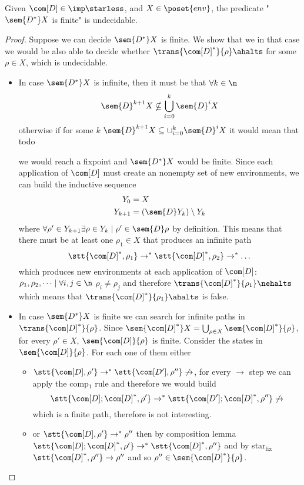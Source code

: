 \begin{lemma}\label{le:infiniteness}
  Given \(\com[D]\in\imp\starless\), and \(X \in \poset{env}\), the
  predicate "\(\sem{D^*}X\) is finite" is undecidable.
\end{lemma}

\begin{proof}
  Suppose we can decide \(\sem{D^*}X\) is finite. We show that we in
  that case we would be also able to decide whether
  \(\trans{\com[D]^*}{\rho}\ahalts\) for some \(\rho \in X\), which is
  undecidable.%
  \begin{itemize}
  \item In case \(\sem{D^*}X\) is infinite, then it must be that
    \(\forall k \in \n\)
    \[\sem{D}^{k+1}X \nsubseteq \bigcup_{i=0}^k\sem{D}^iX\] otherwise if
    for some \(k\) \(\sem{D}^{k+1}X \subseteq \cup_{i=0}^k\sem{D}^iX\)
    it would mean that  todo
    
    we would reach a fixpoint and \(\sem{D^*}X\) would be
    finite. Since each application of \(\com[D]\) must create an
    nonempty set of new environments, we can build the inductive
    sequence
    \begin{align*}
      Y_0 & = X \\
      Y_{k+1} & = (\sem{D}Y_k)\setminus Y_k
    \end{align*}
    where
    \(\forall \rho' \in Y_{k+1} \exists \rho \in Y_k \mid \rho' \in
    \sem{D}\rho\) by definition. This means that there must be at
    least one \(\rho_1\in X\) that produces an infinite path
    \[\stt{\com[D]^*, \rho_1}\to^*\stt{\com[D]^*, \rho_2}\to^*\dots \]
    which produces new environments at each application of
    \(\com[D]\): \(\rho_1, \rho_2, \dots \mid \forall i,j \in \n\)
    \(\rho_i \neq \rho_j\) and therefore
    \(\trans{\com[D]^*}{\rho_1} \nehalts\) which means that
    \(\trans{\com[D]^*}{\rho_1}\ahalts\) is false.
  \item In case \(\sem{D^*}X\) is finite we can search for infinite
    paths in \(\trans{\com[D]^*}{\rho}\). Since
    \(\sem{\com[D]^*}X = \bigcup_{\rho\in X}\sem{\com[D]^*}\{\rho\}\),
    for every \(\rho' \in X\), \(\sem{\com[D]}\{\rho\}\) is
    finite. Consider the states in \(\sem{\com[D]}\{\rho\}\). For each
    one of them either
    \begin{itemize}
    \item
      \(\stt{\com[D], \rho'} \to^* \stt{\com[D'], \rho''} \not\to\),
      for every \(\to\) step we can apply the comp\(_1\) rule and
      therefore we would build
      \[\stt{\com[D];\com[D]^*, \rho'} \to^* \stt{\com[D']; \com[D]^*,
          \rho''} \not\to\] which is a finite path, therefore is not
      interesting.
    \item or \(\stt{\com[D], \rho'} \to^* \rho''\) then by composition
      lemma
      \(\stt{\com[D]; \com[D]^*, \rho'} \to^* \stt{\com[D]^*,
        \rho''}\) and by star\(_{\text{fix}}\)
      \(\stt{\com[D]^*, \rho''} \to \rho''\) and so
      \(\rho'' \in \sem{\com[D]^*}\{\rho\}\).
    \end{itemize}
  \end{itemize}
\end{proof}
